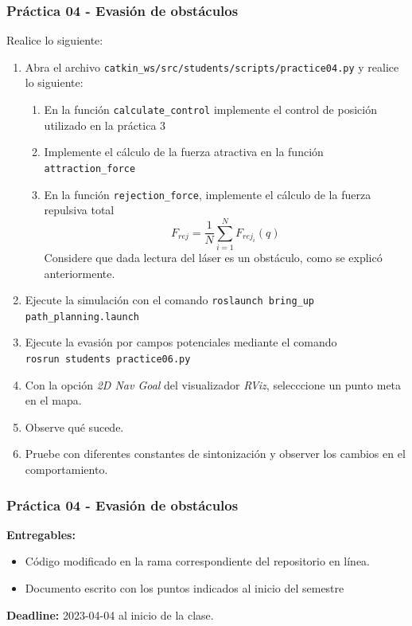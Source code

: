 \begin{frame}[containsverbatim]\frametitle{Práctica 04 - Evasión de obstáculos}
Realice lo siguiente:
  \begin{enumerate}
  \item Abra el archivo \texttt{catkin\_ws/src/students/scripts/practice04.py} y realice lo siguiente:
    \begin{enumerate}
    \item En la función \texttt{calculate\_control} implemente el control de posición utilizado en la práctica 3
    \item Implemente el cálculo de la fuerza atractiva en la función \texttt{attraction\_force}
    \item En la función \texttt{rejection\_force}, implemente el cálculo de la fuerza repulsiva total
      \[F_{rej} = \frac{1}{N}\sum_{i=1}^N F_{rej_i}(q)\]
      Considere que dada lectura del láser es un obstáculo, como se explicó anteriormente.
    \end{enumerate}
  \item Ejecute la simulación con el comando \texttt{roslaunch bring\_up path\_planning.launch}
  \item Ejecute la evasión por campos potenciales mediante el comando\\ \texttt{rosrun students practice06.py}
  \item Con la opción \textit{2D Nav Goal} del visualizador \textit{RViz}, selecccione un punto meta en el mapa.
  \item Observe qué sucede.
  \item Pruebe con diferentes constantes de sintonización y observer los cambios en el comportamiento. 
  \end{enumerate}
\end{frame}

\begin{frame}[containsverbatim]\frametitle{Práctica 04 - Evasión de obstáculos}
 \textbf{Entregables:}
  \begin{itemize}
  \item Código modificado en la rama correspondiente del repositorio en línea.
  \item Documento escrito con los puntos indicados al inicio del semestre
  \end{itemize}
  \textbf{Deadline: } 2023-04-04 al inicio de la clase. 
\end{frame}

